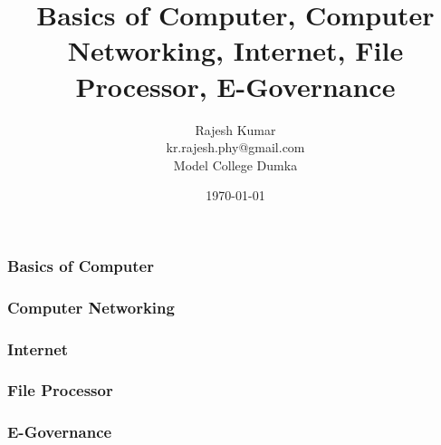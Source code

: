 \documentclass{beamer}
\title{Basics of Computer, Computer Networking, Internet, File Processor, E-Governance}
\author{Rajesh Kumar\\kr.rajesh.phy@gmail.com\\Model College Dumka}
\date{\today}
\begin{document}
\frame{\titlepage}

\begin{frame}
    \frametitle{Basics of Computer}
\end{frame}

\begin{frame}
    \frametitle{Computer Networking}
\end{frame}

\begin{frame}
    \frametitle{Internet}
\end{frame}

\begin{frame}
    \frametitle{File Processor}
\end{frame}

\begin{frame}
    \frametitle{E-Governance}
\end{frame}
\end{document}
